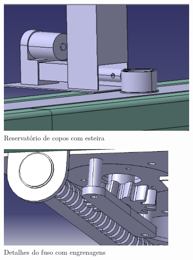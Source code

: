 \begin{apendicesenv}
\begin{figure}[H]
    \centering
    \includegraphics[width=0.9\textwidth]{figuras/estrutura/Recipiente dos Copos + Esteira.png}
    \caption{Reservatório de copos com esteira}
    \label{fig:reservatorioCopos}
\end{figure}

\begin{figure}[H]
    \centering
    \includegraphics[width=0.8\textwidth]{figuras/estrutura/Detalhe Fuso com Engrenagem.png}
    \caption{Detalhes do fuso com engrenagens}
    \label{fig:fusoEngrenagens}
\end{figure}   


\end{apendicesenv}
